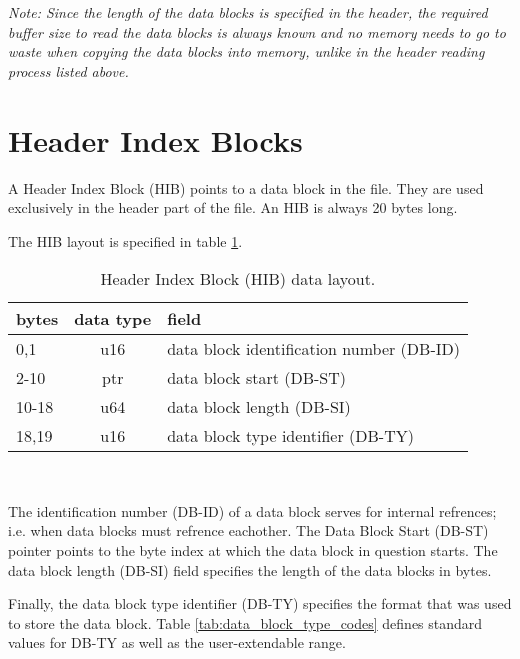 \documentclass[pagesize=a4]{tufte-book}
\begin{document}
\emph{Note: Since the length of the data blocks is specified in the header, the	required buffer size to read the data blocks is always known and no memory needs to go to waste when copying the data blocks into memory, unlike in the header reading process listed above.}

\section{Header Index Blocks}
A Header Index Block (HIB) points to a data block in the file. They are used exclusively in the header part of the file. An HIB is always 20 bytes long.

The HIB layout is specified in table \ref{tab:hib_fields}.

\begin{table}[ht]
	\centering
	\selectfont
	\begin{tabular}{lcl}
		\toprule
		bytes & data type & field\\
		\midrule
		0,1 & u16 & data block identification number (DB-ID)\\
		2-10 & ptr & data block start (DB-ST)\\
		10-18 & u64 & data block length (DB-SI)\\
		18,19 & u16 & data block type identifier (DB-TY)\\
		\bottomrule
	\end{tabular}
	~\label{tab:hib_fields}
	\caption{Header Index Block (HIB) data layout.}	
\end{table}
\vspace{5mm}

The identification number (DB-ID) of a data block serves for internal refrences; i.e. when data blocks must refrence eachother. The Data Block Start (DB-ST) pointer points to the byte index at which the data block in question starts. The data block length (DB-SI) field specifies the length of the data blocks in bytes.

Finally, the data block type identifier (DB-TY) specifies the format that was
used to store the data block. Table \ref{tab:data_block_type_codes} defines standard values for DB-TY as well as the user-extendable range.
\end{document}
